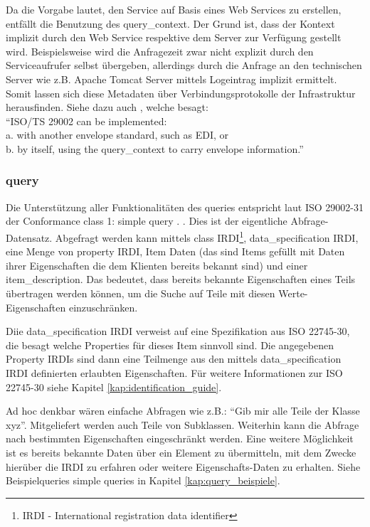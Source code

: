 Da die Vorgabe lautet, den Service auf Basis eines Web Services zu erstellen, entfällt die Benutzung des query\_context. Der Grund ist, dass der Kontext  implizit durch den Web Service respektive dem Server zur Verfügung gestellt wird. Beispielsweise wird die Anfragezeit zwar nicht explizit durch den Serviceaufrufer selbst übergeben, allerdings durch die Anfrage an den technischen Server wie z.B. Apache Tomcat Server mittels Logeintrag implizit ermittelt. Somit lassen sich diese Metadaten über Verbindungsprotokolle der Infrastruktur herausfinden.  
Siehe dazu auch \citep[Kap. 6][]{iso29002-31}, welche besagt: \\ \enquote{ISO/TS 29002 can be implemented: \\
a. with another envelope standard, such as EDI, or \\
b. by itself, using the query\_context to carry envelope information.}

\subsubsection{query}
Die Unterstützung aller Funktionalitäten des queries entspricht laut ISO 29002-31 der Conformance class 1: simple query \citep[Anhang 6][]{iso29002-31}. .
Dies ist der eigentliche Abfrage-Datensatz. Abgefragt werden kann mittels class IRDI\footnote{IRDI  - International registration data identifier}, data\_specification IRDI, eine Menge von property IRDI, Item Daten (das sind Items gefüllt mit Daten ihrer Eigenschaften die dem Klienten bereits bekannt sind) und einer item\_description. Das bedeutet, dass bereits bekannte Eigenschaften eines Teils übertragen werden können, um die Suche auf Teile mit diesen Werte-Eigenschaften einzuschränken.

Diie data\_specification IRDI verweist auf eine Spezifikation aus ISO 22745-30, die besagt welche Properties für dieses Item sinnvoll sind. Die angegebenen Property IRDIs sind dann eine Teilmenge aus den mittels data\_specification IRDI definierten erlaubten Eigenschaften. Für weitere Informationen zur ISO 22745-30 siehe Kapitel \ref{kap:identification_guide}. 

Ad hoc denkbar wären einfache Abfragen wie z.B.: \enquote{Gib mir alle Teile der Klasse xyz}. Mitgeliefert werden auch Teile von Subklassen. Weiterhin kann die Abfrage nach bestimmten Eigenschaften eingeschränkt werden. Eine weitere Möglichkeit ist es bereits bekannte Daten über ein Element zu übermitteln, mit dem Zwecke hierüber die IRDI zu erfahren oder weitere Eigenschafts-Daten zu erhalten. Siehe Beispielqueries simple queries in Kapitel \ref{kap:query_beispiele}. 

